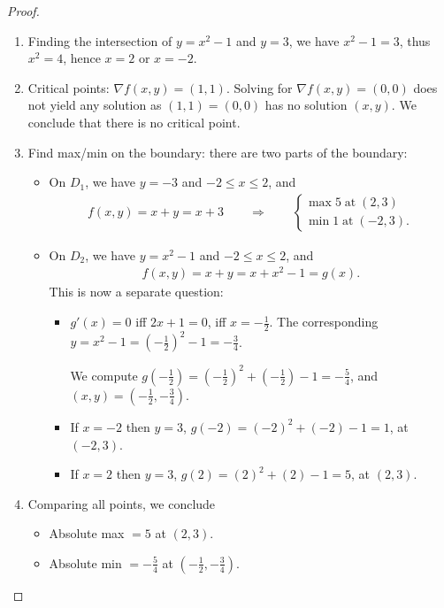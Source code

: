 \begin{proof}\quad 
\begin{enumerate}
    \item Finding the intersection of $y=x^2-1$ and $y=3$, we have $x^2-1 = 3$, thus $x^2 = 4$, hence $x=2$ or $x=-2$.
    \item Critical points: $\nabla f(x,y) = (1,1)$. Solving for $\nabla f(x,y) = (0,0)$ does not yield any solution as      $(1,1) = (0,0)$
    has no solution $(x,y)$. We conclude that there is no critical point. 
    \item Find max/min on the boundary: there are two parts of the boundary:
    \begin{itemize}
        \item On $D_1$, we have $y=-3$ and $-2\leq x\leq 2$, and 
        \begin{align*}
            f(x,y) = x+y = x+3 \qquad \Longrightarrow\qquad \begin{cases}
                \text{max}\; 5\;\text{at}\;(2,3)\\
                \text{min}\; 1\;\text{at}\;(-2,3).
            \end{cases}
        \end{align*}
        \item On $D_2$, we have $y=x^2-1$ and $-2\leq x\leq 2$, and 
        \begin{align*}
            f(x,y) = x+ y = x+ x^2-1 = g(x).
        \end{align*}
        This is now a separate question: 
        \begin{itemize}
            \item $g'(x) = 0$ iff $2x+1 = 0$, iff $x=-\frac{1}{2}$. The corresponding $y = x^2-1 = \left(-\frac{1}{2}\right)^2-1 = -\frac{3}{4}$.
            
            We compute $g\left(-\frac{1}{2}\right) = \left(-\frac{1}{2}\right)^2 + \left(- \frac{1}{2}\right) - 1 = -\frac{5}{4}$, and $(x,y) = \left(-\frac{1}{2}, -\frac{3}{4}\right)$. 
            \item If $x=-2$ then $y=3$, 
            $g(-2) = (-2)^2+(-2)-1 = 1$, at $(-2,3)$.
            \item If $x=2$ then $y=3$, 
            $g(2) = (2)^2+(2)-1 = 5$, at $(2,3)$.
        \end{itemize}
    \end{itemize}
    \item Comparing all points, we conclude 
    \begin{itemize}
        \item Absolute max $=5$ at $(2,3)$.
        \item Absolute min $=-\frac{5}{4}$ at $\left(-\frac{1}{2}, -\frac{3}{4}\right)$.
    \end{itemize}
\end{enumerate}
\end{proof}


